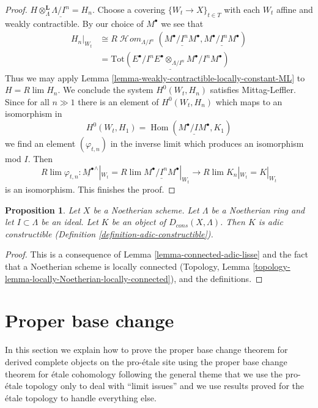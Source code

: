\documentclass{stacks-project}
\theoremstyle{plain}
\newtheorem{proposition}[subsection]{Proposition}
\theoremstyle{definition}
\theoremstyle{remark}
\numberwithin{equation}{subsection}
\def\lim{\mathop{\mathrm{lim}}\nolimits}
\def\Hom{\mathop{\mathrm{Hom}}\nolimits}
\def\SheafHom{\mathop{\mathcal{H}\!\mathit{om}}\nolimits}
\begin{document}
\begin{proof}
$H \otimes_\Lambda^\mathbf{L} \underline{\Lambda/I^n} = H_n$.
Choose a covering $\{W_t \to X\}_{t \in T}$ with each $W_t$
affine and weakly contractible. By our choice of $M^\bullet$
we see that
\begin{align*}
H_n|_{W_t} & \cong 
R\SheafHom_{\Lambda/I^n}(\underline{M^\bullet/I^nM^\bullet},
\underline{M^\bullet/I^nM^\bullet}) \\
& =
\underline{
\text{Tot}(E^\bullet/I^nE^\bullet \otimes_{\Lambda/I^n} M^\bullet/I^nM^\bullet)
}
\end{align*}
Thus we may apply Lemma \ref{lemma-weakly-contractible-locally-constant-ML}
to $H = R\lim H_n$. We conclude the system $H^0(W_t, H_n)$ satisfies
Mittag-Leffler. Since for all $n \gg 1$ there is an element of $H^0(W_t, H_n)$
which maps to an isomorphism in
$$
H^0(W_t, H_1) = \Hom(\underline{M^\bullet/IM^\bullet}, K_1)
$$
we find an element $(\varphi_{t, n})$
in the inverse limit which produces an isomorphism mod $I$. Then
$$
R\lim \varphi_{t, n} :
\underline{M^\bullet}^\wedge|_{W_t} =
R\lim \underline{M^\bullet/I^nM^\bullet}|_{W_t}
\longrightarrow
R\lim K_n|_{W_t} = K|_{W_t}
$$
is an isomorphism. This finishes the proof.
\end{proof}

\begin{proposition}
\label{proposition-Noetherian-adic-constructible}
Let $X$ be a Noetherian scheme. Let $\Lambda$ be a Noetherian ring and
let $I \subset \Lambda$ be an ideal. Let $K$ be an object of
$D_{cons}(X, \Lambda)$. Then $K$ is adic constructible
(Definition \ref{definition-adic-constructible}).
\end{proposition}

\begin{proof}
This is a consequence of Lemma \ref{lemma-connected-adic-lisse}
and the fact that a Noetherian scheme is locally connected
(Topology, Lemma \ref{topology-lemma-locally-Noetherian-locally-connected}),
and the definitions.
\end{proof}







\section{Proper base change}
\label{section-proper-base-change}

\noindent
In this section we explain how to prove the proper base change theorem
for derived complete objects on the pro-\'etale site using the proper
base change theorem for \'etale cohomology following the general theme
that we use the pro-\'etale topology only to deal with ``limit issues''
and we use results proved for the \'etale topology to handle everything
else.
\end{document}
